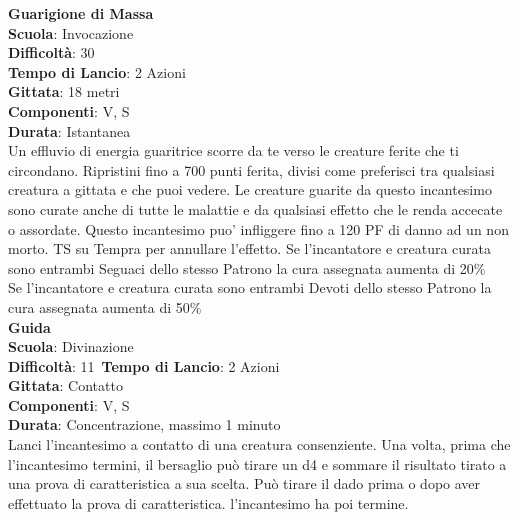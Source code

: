 \begin{multicols}{2}
\medskip\textbf{Guarigione di Massa}\\
\textbf{Scuola}: Invocazione\\
\textbf{Difficoltà}:  30\\
\textbf{Tempo di Lancio}: 2 Azioni\\
\textbf{Gittata}: 18 metri\\
\textbf{Componenti}: V, S\\
\textbf{Durata}: Istantanea\\
Un effluvio di energia guaritrice scorre da te verso le creature ferite che ti circondano. Ripristini fino a 700 punti ferita, divisi come preferisci tra qualsiasi creatura a gittata e che puoi vedere. Le creature guarite da questo incantesimo sono curate anche di tutte le malattie e da qualsiasi effetto che le renda accecate o assordate. Questo incantesimo puo' infliggere fino a 120 PF di danno ad un non morto. TS su Tempra per annullare l'effetto.
Se l'incantatore e creatura curata sono entrambi Seguaci dello stesso Patrono la cura assegnata aumenta di 20\%\\
Se l'incantatore e creatura curata sono entrambi Devoti dello stesso Patrono la cura assegnata aumenta di 50\%\\

\medskip\textbf{Guida}\\
\textbf{Scuola}: Divinazione\\
\textbf{Difficoltà}: 11\
\textbf{Tempo di Lancio}: 2 Azioni\\
\textbf{Gittata}: Contatto\\
\textbf{Componenti}: V, S\\
\textbf{Durata}: Concentrazione, massimo 1 minuto\\
Lanci l'incantesimo a contatto di una creatura consenziente. Una volta, prima che l'incantesimo termini, il bersaglio può tirare un d4 e sommare il risultato tirato a una prova di caratteristica a sua scelta. Può tirare il dado prima o dopo aver effettuato la prova di caratteristica. l'incantesimo ha poi termine. 


\end{multicols}
